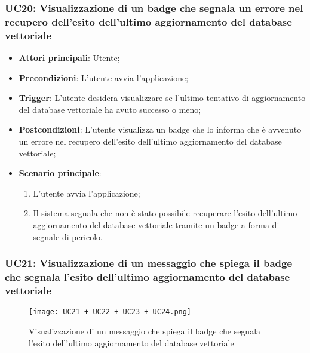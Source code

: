 \subsubsection{UC20: Visualizzazione di un badge che segnala un errore nel recupero dell'esito dell'ultimo aggiornamento del database vettoriale}
\begin{itemize}
    \item \textbf{Attori principali}: Utente;
    \item \textbf{Precondizioni}: L'utente avvia l'applicazione;
    \item \textbf{Trigger}: L'utente desidera visualizzare se l'ultimo tentativo di aggiornamento del database vettoriale
    ha avuto successo o meno;
    \item \textbf{Postcondizioni}: L'utente visualizza un badge che lo informa che è avvenuto un errore nel recupero
    dell'esito dell'ultimo aggiornamento del database vettoriale;
    \item \textbf{Scenario principale}:
    \begin{enumerate}
        \item L'utente avvia l'applicazione;
        \item Il sistema segnala che non è stato possibile recuperare l'esito dell'ultimo aggiornamento del database vettoriale
        tramite un badge a forma di segnale di pericolo.
    \end{enumerate}
\end{itemize}


\hypertarget{UC21}{}
\subsubsection{UC21: Visualizzazione di un messaggio che spiega il badge che segnala l'esito dell'ultimo aggiornamento del database vettoriale}

\begin{figure}[h]
    \centering
    \texttt{[image: UC21 + UC22 + UC23 + UC24.png]}
    \caption{Visualizzazione di un messaggio che spiega il badge che segnala l'esito dell'ultimo aggiornamento del database vettoriale}
\end{figure}

